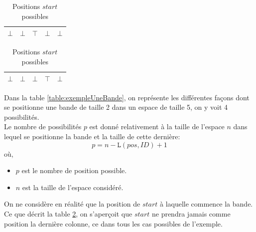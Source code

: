 \documentclass[a4paper,12pt]{report}
\newcommand\grey{\cellcolor{black!50}}
\begin{document}
\begin{table}[H]
\begin{subtable}[B]{0.5\textwidth}
			\begin{tabular}{|c|c|c|c|c|}
			\hline 
			$\bot$ & $\bot$ & \grey $\top$  & $\bot$ & $\bot$ \\ 
			\hline
			\end{tabular}

			\begin{tabular}{|c|c|c|c|c|}
			\hline 
			$\bot$ & $\bot$ & $\bot$ & \grey $\top$ & $\bot$\\ 
			\hline
			\end{tabular}
			
        \caption{Positions $start$ possibles}
        \label{table:PosPossible}
    \end{subtable}
\end{table}

Dans la table \ref{table:exempleUneBande}, on représente les différentes façons dont se positionne une bande de taille 2 dans un espace de taille 5, on y voit 4 possibilités.\\
Le nombre de possibilités $p$ est donné relativement à la taille de l'espace $n$ dans lequel se positionne la bande et la taille de cette dernière:
$$p = n-\mathtt{L}(pos,ID)+1$$
où,
\begin{itemize}
\item[] $p$ est le nombre de position possible.
\item[] $n$ est la taille de l'espace considéré.\\
\end{itemize}
On ne considère en réalité que la position de $start$ à laquelle commence la bande. Ce que décrit la table \ref{table:PosPossible}, on s'aperçoit que $start$ ne prendra jamais comme position la dernière colonne, ce dans tous les cas possibles de l'exemple. 
\end{document}
